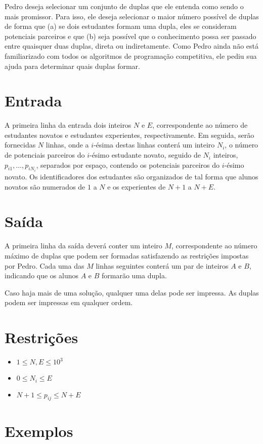 Pedro deseja selecionar um conjunto de duplas que ele entenda como sendo o mais promissor. Para isso, ele deseja selecionar o maior número possível
de duplas de forma que (a) se dois estudantes formam uma dupla, eles se consideram potenciais parceiros e que (b) seja possível que o conhecimento
possa ser passado entre quaisquer duas duplas, direta ou indiretamente. Como Pedro ainda não está familiarizado com todos os algoritmos de programação
competitiva, ele pediu sua ajuda para determinar quais duplas formar.



\section*{Entrada}

A primeira linha da entrada dois inteiros $N$ e $E$, correspondente ao número de estudantes novatos e estudantes experientes, respectivamente.
Em seguida, serão fornecidas $N$ linhas, onde a $i$-ésima destas linhas conterá um inteiro $N_i$, o número de potenciais parceiros do $i$-ésimo
estudante novato, seguido de $N_i$ inteiros, $p_{i1}, \ldots, p_{iN_i}$, separados por espaço, contendo os potenciais parceiros do $i$-ésimo novato.
Os identificadores dos estudantes são organizados de tal forma que alunos novatos são numerados de $1$ a $N$ e os experientes de $N + 1$ a $N + E$.


\section*{Saída}

A primeira linha da saída deverá conter um inteiro $M$, correspondente ao número máximo de duplas que podem ser formadas satisfazendo as restrições
impostas por Pedro. Cada uma das $M$ linhas seguintes conterá um par de inteiros $A$ e $B$, indicando que os alunos $A$ e $B$ formarão uma dupla. 

Caso haja mais de uma solução, qualquer uma delas pode ser impressa. As duplas podem ser impressas em qualquer ordem. 

\section*{Restrições}

\begin{itemize}
    \item $1 \leq N,E \leq 10^{3}$
    \item $0 \leq N_i \leq E$
    \item $N+1 \leq p_{ij} \leq N+E$
\end{itemize}


\section*{Exemplos}

\exemplo
